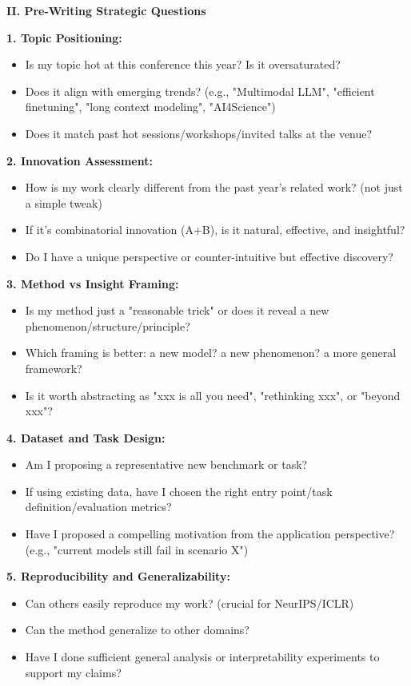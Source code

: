 \documentclass[11pt,a4paper]{article}
\begin{document}
\textbf{II. Pre-Writing Strategic Questions}

\textbf{1. Topic Positioning:}
\begin{itemize}
    \item Is my topic hot at this conference this year? Is it oversaturated?
    \item Does it align with emerging trends? (e.g., "Multimodal LLM", "efficient finetuning", "long context modeling", "AI4Science")
    \item Does it match past hot sessions/workshops/invited talks at the venue?
\end{itemize}

\textbf{2. Innovation Assessment:}
\begin{itemize}
    \item How is my work clearly different from the past year's related work? (not just a simple tweak)
    \item If it's combinatorial innovation (A+B), is it natural, effective, and insightful?
    \item Do I have a unique perspective or counter-intuitive but effective discovery?
\end{itemize}

\textbf{3. Method vs Insight Framing:}
\begin{itemize}
    \item Is my method just a "reasonable trick" or does it reveal a new phenomenon/structure/principle?
    \item Which framing is better: a new model? a new phenomenon? a more general framework?
    \item Is it worth abstracting as "xxx is all you need", "rethinking xxx", or "beyond xxx"?
\end{itemize}

\textbf{4. Dataset and Task Design:}
\begin{itemize}
    \item Am I proposing a representative new benchmark or task?
    \item If using existing data, have I chosen the right entry point/task definition/evaluation metrics?
    \item Have I proposed a compelling motivation from the application perspective? (e.g., "current models still fail in scenario X")
\end{itemize}

\textbf{5. Reproducibility and Generalizability:}
\begin{itemize}
    \item Can others easily reproduce my work? (crucial for NeurIPS/ICLR)
    \item Can the method generalize to other domains?
    \item Have I done sufficient general analysis or interpretability experiments to support my claims?
\end{itemize}
\end{document}
